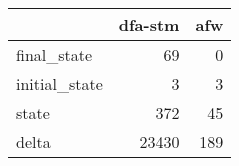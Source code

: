 \begin{tabular}{lrr}
\toprule
{} &  dfa-stm &  afw \\
\midrule
final\_state   &       69 &    0 \\
initial\_state &        3 &    3 \\
state         &      372 &   45 \\
delta         &    23430 &  189 \\
\bottomrule
\end{tabular}

